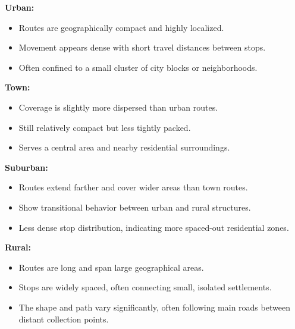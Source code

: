 \documentclass[a4paper,12pt,twoside]{scrreprt}
\begin{document}
\textbf{Urban:}
\begin{itemize}
  \item Routes are geographically compact and highly localized.
  \item Movement appears dense with short travel distances between stops.
  \item Often confined to a small cluster of city blocks or neighborhoods.
\end{itemize}

\textbf{Town:}
\begin{itemize}
  \item Coverage is slightly more dispersed than urban routes.
  \item Still relatively compact but less tightly packed.
  \item Serves a central area and nearby residential surroundings.
\end{itemize}

\textbf{Suburban:}
\begin{itemize}
  \item Routes extend farther and cover wider areas than town routes.
  \item Show transitional behavior between urban and rural structures.
  \item Less dense stop distribution, indicating more spaced-out residential
        zones.
\end{itemize}

\textbf{Rural:}
\begin{itemize}
  \item Routes are long and span large geographical areas.
  \item Stops are widely spaced, often connecting small, isolated settlements.
  \item The shape and path vary significantly, often following main roads
        between distant collection points.
\end{itemize}
\end{document}
